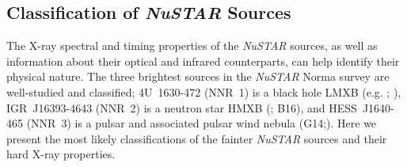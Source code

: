 \documentclass[iop,revtex4]{emulateapj}
\begin{document}
\subsection{Classification of \textit{NuSTAR} Sources}
\label{sec:classification}
The X-ray spectral and timing properties of the \textit{NuSTAR} sources, as well as information about their optical and infrared counterparts, can help identify their physical nature.  The three brightest sources in the \textit{NuSTAR} Norma survey are well-studied and classified; 4U~1630-472 (NNR~1) is a black hole LMXB (e.g. \citealt{barret96}; \citealt{klein04}), IGR~J16393-4643 (NNR~2) is a neutron star HMXB (\citealt{bodaghee06}; B16), and HESS~J1640-465 (NNR~3) is a pulsar and associated pulsar wind nebula (G14;\citealt{archibald16}).  Here we present the most likely classifications of the fainter \textit{NuSTAR} sources and their hard X-ray properties.
\end{document}
